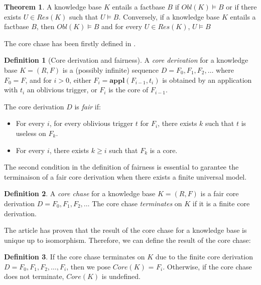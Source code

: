 \documentclass{article}
\theoremstyle{definition}
\newtheorem{definition}{Definition}[section]
\newtheorem{theorem}{Theorem}[section]
\theoremstyle{remark}
\newcommand{\Appl}{\textbf{appl}}
\begin{document}
\begin{theorem}
A knowledge base $K$ entails a factbase $B$ if $\textit{Obl}(K) \models B$ or if there exists $U \in \textit{Res}(K)$ such that $U \models B$. Conversely, if a knowledge base $K$ entails a factbase $B$, then $\textit{Obl}(K) \models B$ and for every $U \in \textit{Res}(K)$, $U \models B$
\end{theorem}


The core chase has been firstly defined in \cite{core_chase}.

\begin{definition}[Core derivation and fairness]
A \emph{core derivation} for a knowledge base $K = (R,F)$ is a (possibly infinite) sequence $D = F_0, F_1, F_2, \ldots$ where $F_0 = F$, and for $i >0$, either $F_{i}= \Appl(F_{i-1},t_i)$ is obtained by an application with $t_i$ an oblivious trigger, or $F_i$ is the core of $F_{i-1}$. 

The core derivation $D$ is \emph{fair} if:
\begin{itemize}
\item For every $i$, for every oblivious trigger $t$ for $F_i$, there exists $k$ such that $t$ is useless on $F_k$.
\item For every $i$, there exists $k \geq i$ such that $F_k$ is a core.

\end{itemize}
\end{definition}

The second condition in the definition of fairness is essential to garantee the terminaison of a fair core derivation when there exists a finite universal model.

\begin{definition}
A \emph{core chase} for a knowledge base $K= (R,F)$ is a fair core derivation $D=F_0,F_1,F_2,\ldots$ The core chase \emph{terminates} on $K$ if it is a finite core derivation.
\end{definition}

The article \cite{core_chase} has proven that the result of the core chase for a knowledge base is unique up to isomorphism. Therefore, we can define the result of the core chase:

\begin{definition}
If the core chase terminates on $K$ due to the finite core derivation $D=F_0,F_1,F_2,\ldots,F_i$, then we pose \emph{$\textit{Core}(K)$} = $F_i$. Otherwise, if the core chase does not terminate, $\textit{Core}(K)$ is undefined.
\end{definition}
\end{document}
